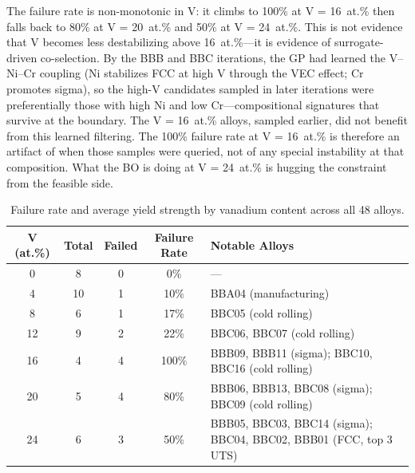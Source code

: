 \documentclass[preprint,12pt,times]{elsarticle}  %
\begin{document}
The failure rate is non-monotonic in V: it climbs to 100\% at V = 16~at.\% then falls back to 80\% at V = 20~at.\% and 50\% at V = 24~at.\%. This is not evidence that V becomes less destabilizing above 16~at.\%---it is evidence of surrogate-driven co-selection. By the BBB and BBC iterations, the GP had learned the V--Ni--Cr coupling (Ni stabilizes FCC at high V through the VEC effect; Cr promotes sigma), so the high-V candidates sampled in later iterations were preferentially those with high Ni and low Cr---compositional signatures that survive at the boundary. The V = 16~at.\% alloys, sampled earlier, did not benefit from this learned filtering. The 100\% failure rate at V = 16~at.\% is therefore an artifact of when those samples were queried, not of any special instability at that composition. What the BO is doing at V = 24~at.\% is hugging the constraint from the feasible side.

\begin{table}[t]
\centering
\caption{Failure rate and average yield strength by vanadium content across all 48 alloys.}
\label{tab:v_failure}
\small
\begin{tabular}{ccccp{}}
\toprule
\textbf{V (at.\%)} & \textbf{Total} & \textbf{Failed} & \textbf{Failure Rate} & \textbf{Notable Alloys} \\
\midrule
0  & 8  & 0 & 0\%   & --- \\
4  & 10 & 1 & 10\%  & BBA04 (manufacturing) \\
8  & 6  & 1 & 17\%  & BBC05 (cold rolling) \\
12 & 9  & 2 & 22\%  & BBC06, BBC07 (cold rolling) \\
16 & 4  & 4 & 100\% & BBB09, BBB11 (sigma); BBC10, BBC16 (cold rolling) \\
20 & 5  & 4 & 80\%  & BBB06, BBB13, BBC08 (sigma); BBC09 (cold rolling) \\
24 & 6  & 3 & 50\%  & BBB05, BBC03, BBC14 (sigma); BBC04, BBC02, BBB01 (FCC, top 3 UTS) \\
\bottomrule
\end{tabular}
\end{table}
\end{document}

